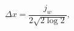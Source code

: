 \documentclass[12pt]{ociamthesis}
\begin{document}
\begin{equation}
\Delta x = \dfrac{j_w}{2 \sqrt{2 \log{2}}},
\end{equation}  


  
\end{document}
